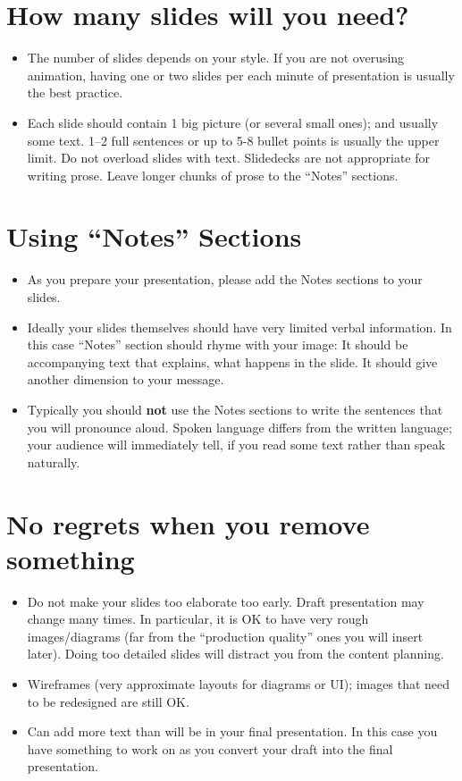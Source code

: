 \documentclass[jou]{apa6}
\begin{document}
\section{How many slides will you need?}

\begin{itemize}
\item The number of slides depends on your style. If you are not overusing animation,
having one or two slides per each minute of presentation is usually the best practice. 
\item Each slide should contain 1 big picture (or several small ones); and usually some text. 
1--2 full sentences or up to 5-8 bullet points is usually the upper limit.
Do not overload slides with text. Slidedecks are not appropriate for writing prose.
Leave longer chunks of prose to the ``Notes'' sections.
\end{itemize}



\section{Using ``Notes'' Sections}

\begin{itemize}
\item As you prepare your presentation, please add the Notes sections to your slides. 
\item Ideally your slides themselves should have very limited verbal information. 
In this case ``Notes'' section should rhyme with your image: It should be accompanying 
text that explains, what happens in the slide. It should give another dimension to your message.
\item Typically you should {\bf not} use the Notes sections to write the sentences that you 
will pronounce aloud. Spoken language differs from the written language; your audience
will immediately tell, if you read some text rather than speak naturally.
\end{itemize}


\section{No regrets when you remove something}

\begin{itemize}
\item Do not make your slides too elaborate too early. Draft presentation may change many times.
In particular, it is OK to have very rough images/diagrams 
(far from the ``production quality'' ones you will insert later).
Doing too detailed slides will distract you from the content planning. 
\item Wireframes (very approximate layouts for diagrams or UI); images that 
need to be redesigned are still OK.
\item Can add more text than will be in your final presentation. 
In this case you have something to work on as you convert 
your draft into the final presentation.
\end{itemize}
\end{document}
